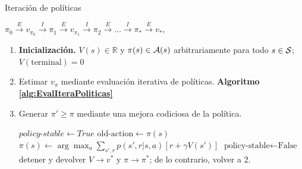 \documentclass[10pt, envcountsect, handout, aspectratio=1610, hyperref={hypertexnames=true}]{beamer}
\begin{document}
\begin{frame}{Iteración de políticas}
\centerline{$\pi_0 \stackrel{E}{\longrightarrow} v_{\pi_0} \stackrel{I}{\longrightarrow} \pi_1 \stackrel{E}{\longrightarrow} v_{\pi_1} \stackrel{I}{\longrightarrow} \pi_2 \stackrel{E}{\longrightarrow} \dots \stackrel{I}{\longrightarrow} \pi_* \stackrel{E}{\longrightarrow} v_*,
$}
	

	
\begin{algorithm}[H]
	\caption{Iteración de políticas (usando evaluación iterativa de políticas) para estimar \(\pi \to \pi^*\)}
	
	\begin{enumerate}
		\item \textbf{Inicialización.} \hfil \(V(s) \in \mathbb{R}\) y \(\pi(s) \in {\cal A}(s)\) arbitrariamente para todo \(s \in {\cal S}\); \(V(\text{terminal}) = 0\)
		
		
		\item {} \hfil Estimar $v_\pi$ mediante evaluación iterativa de políticas. \textbf{Algoritmo \ref{alg:EvalIteraPoliticas}}
					
		\item {} \hfil Generar $\pi' \geq \pi$ mediante una mejora codiciosa de la política.
		
		\vskip -1cm
		\begin{algorithmic}[1]
			\STATE \( {policy\text{-}stable} \leftarrow {True} \)
			\STATE  \( \text{old-action} \leftarrow \pi(s) \)
			\STATE  \( \pi(s) \leftarrow \arg\max_a \sum_{s', r} p(s', r | s, a) [r + \gamma V(s')]\)
			\STATE \( \text{policy-stable} \leftarrow \text{False} \)
			\ENDIF
			\ENDFOR
			\STATE detener y devolver \(V \to v^*\) y \(\pi \to \pi^*\); de lo contrario, volver a 2.
			\ENDIF
		\end{algorithmic}
		
	\end{enumerate}
\end{algorithm}

\end{frame}
\end{document}
